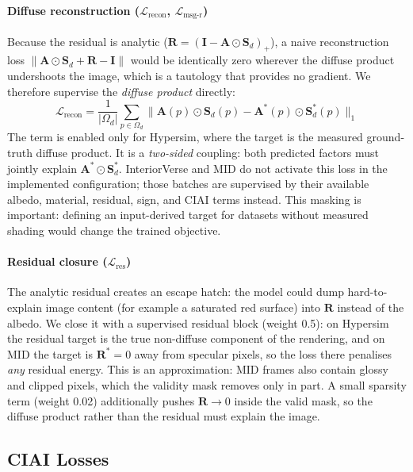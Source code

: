 \paragraph{Diffuse reconstruction ($\mathcal{L}_{\text{recon}}$,
$\mathcal{L}_{\text{msg-r}}$)}
Because the residual is analytic ($\mathbf{R} = (\mathbf{I} - \mathbf{A}\odot\mathbf{S}_d)_+$),
a naive reconstruction loss $\|\mathbf{A}\odot\mathbf{S}_d + \mathbf{R} - \mathbf{I}\|$
would be identically zero wherever the diffuse product undershoots the image, which is a
tautology that provides no gradient.
We therefore supervise the \emph{diffuse product} directly:
\begin{equation}
  \mathcal{L}_{\text{recon}} =
  \frac{1}{|\Omega_d|}\sum_{p \in \Omega_d}
  \bigl\| \mathbf{A}(p) \odot \mathbf{S}_d(p) -
          \mathbf{A}^*(p) \odot \mathbf{S}^*_d(p) \bigr\|_1
  \label{eq:l_recon}
\end{equation}
The term is enabled only for Hypersim, where the target is the measured
ground-truth diffuse product. It is a \emph{two-sided} coupling: both predicted
factors must jointly explain $\mathbf{A}^*\odot\mathbf{S}^*_d$. InteriorVerse and
MID do not activate this loss in the implemented configuration; those batches
are supervised by their available albedo, material, residual, sign, and CIAI
terms instead. This masking is important: defining an input-derived target for
datasets without measured shading would change the trained objective.

\paragraph{Residual closure ($\mathcal{L}_{\text{res}}$)}
The analytic residual creates an escape hatch: the model could dump hard-to-
explain image content (for example a saturated red surface) into $\mathbf{R}$
instead of the albedo.
We close it with a supervised residual block (weight 0.5): on Hypersim the
residual target is the true non-diffuse component of the rendering, and on MID
the target is $\mathbf{R}^* = 0$ away from specular pixels, so the loss there penalises
\emph{any} residual energy. This is an approximation: MID frames also contain glossy and
clipped pixels, which the validity mask removes only in part.
A small sparsity term (weight 0.02) additionally pushes $\mathbf{R} \to 0$
inside the valid mask, so the diffuse product rather than the residual must explain
the image.

\subsection{CIAI Losses}

